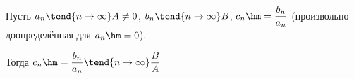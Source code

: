 
Пусть $a_n\tend{n\to\infty}A\neq 0$, $b_n\tend{n\to \infty}B$, $c_n\hm=\dfrac{b_n}{a_n}$ (произвольно доопределённая для $a_n\hm=0$).

Тогда $c_n\hm=\dfrac{b_n}{a_n}\tend{n\to\infty}\dfrac{B}{A}$

